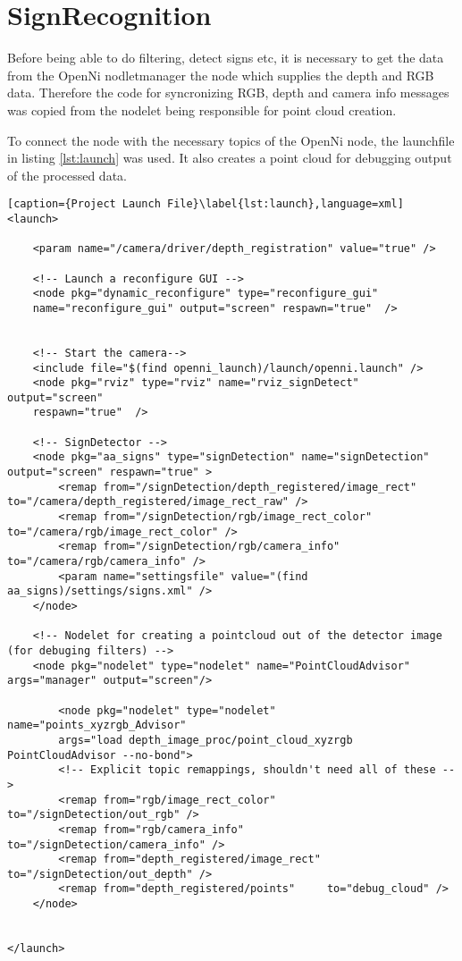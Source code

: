 \graphicspath{{./Software/img/}}
\chapter{SignRecognition}
 
 Before being able to do filtering, detect signs etc, it is necessary to get the data from the OpenNi nodletmanager
 the node which supplies the depth and RGB data. Therefore the code for syncronizing RGB, 
 depth and camera info messages was copied from the nodelet being responsible 
 for point cloud creation. 
 
To connect the node with the necessary topics of the OpenNi node, the launchfile in listing \vref{lst:launch}
was used. It also creates a point cloud for debugging output of the processed data.

\begin{lstlisting}[caption={Project Launch File}\label{lst:launch},language=xml]
<launch>

	<param name="/camera/driver/depth_registration" value="true" />	

	<!-- Launch a reconfigure GUI -->
	<node pkg="dynamic_reconfigure" type="reconfigure_gui" 
	name="reconfigure_gui" output="screen" respawn="true"  />
	
	
	<!-- Start the camera-->
	<include file="$(find openni_launch)/launch/openni.launch" />
	<node pkg="rviz" type="rviz" name="rviz_signDetect" output="screen" 
	respawn="true"  />

	<!-- SignDetector -->
	<node pkg="aa_signs" type="signDetection" name="signDetection" output="screen" respawn="true" > 
 		<remap from="/signDetection/depth_registered/image_rect" 	to="/camera/depth_registered/image_rect_raw" />
 		<remap from="/signDetection/rgb/image_rect_color" 			to="/camera/rgb/image_rect_color" />
 		<remap from="/signDetection/rgb/camera_info" 				to="/camera/rgb/camera_info" />
 		<param name="settingsfile" value="(find aa_signs)/settings/signs.xml" />
	</node>

  	<!-- Nodelet for creating a pointcloud out of the detector image (for debuging filters) -->
	<node pkg="nodelet" type="nodelet" name="PointCloudAdvisor" args="manager" output="screen"/>

		<node pkg="nodelet" type="nodelet" name="points_xyzrgb_Advisor" 
		args="load depth_image_proc/point_cloud_xyzrgb PointCloudAdvisor --no-bond">
	    <!-- Explicit topic remappings, shouldn't need all of these -->
	    <remap from="rgb/image_rect_color"        to="/signDetection/out_rgb" />
	    <remap from="rgb/camera_info"             to="/signDetection/camera_info" />
	    <remap from="depth_registered/image_rect" to="/signDetection/out_depth" />
	    <remap from="depth_registered/points"     to="debug_cloud" />
  	</node>
  	
  	
</launch>
\end{lstlisting}

